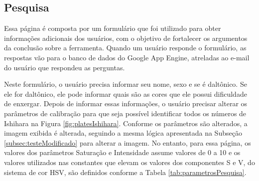 \documentclass[	12pt, Times, openright, twoside, a4paper, english, brazil]{abntex2}
\begin{document}
\subsection{Pesquisa}
\label{subsec:pesquisa}

Essa página é composta por um formulário que foi utilizado para obter informações adicionais dos usuários, com o objetivo de fortalecer os argumentos da conclusão sobre a ferramenta. Quando um usuário responde o formulário, as respostas vão para o banco de dados do Google App Engine, atreladas ao e-mail do usuário que respondeu as perguntas.


Neste formulário, o usuário precisa informar seu nome, sexo e se é daltônico. Se ele for daltônico, ele pode informar quais são as cores que ele possui dificuldade de enxergar. Depois de informar essas informações, o usuário precisar alterar os parâmetros de calibração para que seja possível identificar todos os números de Ishihara na Figura \ref{fig:platesIshihara}. Conforme os parâmetros são alterados, a imagem exibida é alterada, seguindo a mesma lógica apresentada na Subseção \ref{subsec:testeModificado} para alterar a imagem. No entanto, para essa página, os valores dos parâmetros Saturação e Intensidade assume valores de 0 a 10 e os valores utilizados nas constantes que elevam os valores dos componentes S e V, do sistema de cor HSV, são definidos conforme a Tabela \ref{tab:parametrosPesquisa}. 
\end{document}
